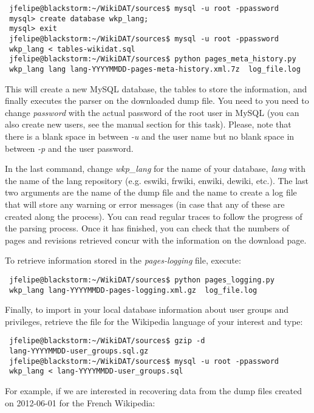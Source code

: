 \begin{verbatim}
 jfelipe@blackstorm:~/WikiDAT/sources$ mysql -u root -ppassword
 mysql> create database wkp_lang;
 mysql> exit
 jfelipe@blackstorm:~/WikiDAT/sources$ mysql -u root -ppassword 
 wkp_lang < tables-wikidat.sql
 jfelipe@blackstorm:~/WikiDAT/sources$ python pages_meta_history.py 
 wkp_lang lang lang-YYYYMMDD-pages-meta-history.xml.7z  log_file.log
\end{verbatim}

This will create a new MySQL database, the tables to store the information, and
finally executes the parser on the downloaded dump file. You need to you need
to change \textit{password} with the actual password of the root user in
MySQL (you can also create new users, see the manual section for this task). Please,
note that there is a blank space in between \textit{-u} and the user name but no
blank space in between \textit{-p} and the user password.

In the last command, change
\textit{wkp\_lang} for the name of your database, \textit{lang} with the name of
the lang repository (e.g. eswiki, frwiki, enwiki, dewiki, etc.). The last two
arguments are the name of the dump file and the name to create a log file that
will store any warning or error messages (in case that any of these are created
along the process). You can read regular traces to follow the progress of the
parsing process. Once it has finished, you can check that the numbers of pages
and revisions retrieved concur with the information on the download page.

To retrieve information stored in the \textit{pages-logging} file, execute:

\begin{verbatim}
 jfelipe@blackstorm:~/WikiDAT/sources$ python pages_logging.py 
 wkp_lang lang-YYYYMMDD-pages-logging.xml.gz  log_file.log
\end{verbatim}

Finally, to import in your local database information about user groups and
privileges, retrieve the file for the Wikipedia language of your interest and
type:

\begin{verbatim}
 jfelipe@blackstorm:~/WikiDAT/sources$ gzip -d 
 lang-YYYYMMDD-user_groups.sql.gz
 jfelipe@blackstorm:~/WikiDAT/sources$ mysql -u root -ppassword 
 wkp_lang < lang-YYYYMMDD-user_groups.sql
\end{verbatim}

For example, if we are interested in recovering data from the dump files
created on 2012-06-01 for the French Wikipedia:

